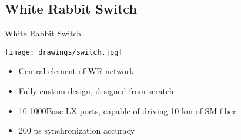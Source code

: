 \documentclass[xcolor=dvipsnames]{beamer}
\begin{document}



\subsection {White Rabbit Switch}


\begin{frame}{White Rabbit Switch}
\begin{center}
\texttt{[image: drawings/switch.jpg]}
\end{center}
\begin{itemize}
\item Central element of WR network
\item Fully custom design, designed from scratch
\item 10 1000Base-LX ports, capable of driving 10 km of SM fiber
\item 200 ps synchronization accuracy
\end{itemize}
\end{frame}
\end{document}
